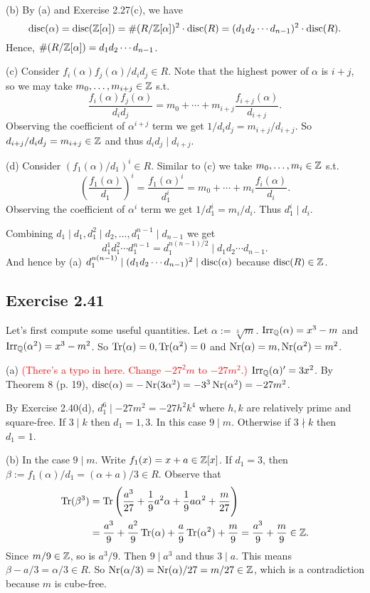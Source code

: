 \documentclass[../Marcus.tex]{subfiles}
\begin{document}
(b) By (a) and Exercise 2.27(c), we have
$$
\operatorname{disc}(\alpha)=\operatorname{disc}(\mathbb{Z}[\alpha])
= \#(R/\mathbb{Z}[\alpha])^2\cdot\operatorname{disc}(R)
= (d_1d_2\cdots d_{n-1})^2\cdot\operatorname{disc}(R).
$$
Hence, $\#(R/\mathbb{Z}[\alpha])=d_1d_2\cdots d_{n-1}$.

(c) Consider $f_i(\alpha)f_j(\alpha)/d_id_j\in R$. Note that the highest power of $\alpha$ is $i+j$, so we may take $m_0,\ldots,m_{i+j}\in\mathbb{Z}$ s.t. 
$$
\frac{f_i(\alpha)f_j(\alpha)}{d_id_j}=m_0+\cdots+m_{i+j}\frac{f_{i+j}(\alpha)}{d_{i+j}}.
$$ 
Observing the coefficient of $\alpha^{i+j}$ term we get $1/d_id_j=m_{i+j}/d_{i+j}$. So $d_{i+j}/d_id_j=m_{i+j}\in\mathbb{Z}$ and thus $d_id_j\mid d_{i+j}$.

(d) Consider $(f_1(\alpha)/d_1)^i\in R$. Similar to (c) we take $m_0,\ldots,m_i\in\mathbb{Z}$ s.t. 
$$
\left(\frac{f_1(\alpha)}{d_1}\right)^i=\frac{f_1(\alpha)^i}{d_1^i}=m_0+\cdots+m_i\frac{f_i(\alpha)}{d_i}.
$$ 
Observing the coefficient of $\alpha^i$ term we get $1/d_1^i=m_i/d_i$. Thus $d_1^i\mid d_i$.

Combining $d_1\mid d_1,d_1^2\mid d_2,\ldots,d_1^{n-1}\mid d_{n-1}$ we get 
$$
d_1^1d_1^2\cdots d_1^{n-1}=d_1^{n(n-1)/2}\mid d_1d_2\cdots d_{n-1}.
$$ 
And hence by (a) $d_1^{n(n-1)}\mid (d_1d_2\cdots d_{n-1})^2\mid \operatorname{disc}(\alpha)$ because $\operatorname{disc}(R)\in\mathbb{Z}$.

\subsection*{Exercise 2.41}

Let's first compute some useful quantities. Let $\alpha:=\sqrt[3]{m}$. $\operatorname{Irr}_{\mathbb{Q}}(\alpha)=x^3-m$ and $\operatorname{Irr}_{\mathbb{Q}}(\alpha^2)=x^3-m^2$. So $\operatorname{Tr}(\alpha)=0,\operatorname{Tr}(\alpha^2)=0$ and $\operatorname{Nr}(\alpha)=m,\operatorname{Nr}(\alpha^2)=m^2$.

(a) \textcolor{red}{(There's a typo in here. Change $-27^2m$ to $-27m^2$.)} $\operatorname{Irr}_{\mathbb{Q}}(\alpha)'=3x^2$. By Theorem 8 (p. 19), $\operatorname{disc}(\alpha)=-\operatorname{Nr}(3\alpha^2)=-3^3\operatorname{Nr}(\alpha^2)=-27m^2$.

By Exercise 2.40(d), $d_1^6\mid -27m^2=-27h^2k^4$ where $h,k$ are relatively prime and square-free. If $3\mid k$ then $d_1=1,3$. In this case $9\mid m$. Otherwise if $3\nmid k$ then $d_1=1$.

(b) In the case $9\mid m$. Write $f_1(x)=x+a\in\mathbb{Z}[x]$. If $d_1=3$, then $\beta:=f_1(\alpha)/d_1=(\alpha+a)/3\in R$. Observe that
\begin{align*}
    \operatorname{Tr}(\beta^3) &= \operatorname{Tr}\left(\frac{a^3}{27}+\frac{1}{9}a^2\alpha+\frac{1}{9}a\alpha^2+\frac{m}{27}\right) \\ 
    &= \frac{a^3}{9}+\frac{a^2}{9}\operatorname{Tr}(\alpha)+\frac{a}{9}\operatorname{Tr}(\alpha^2)+\frac{m}{9} = \frac{a^3}{9}+\frac{m}{9} \in\mathbb{Z}.
\end{align*}
Since $m/9\in\mathbb{Z}$, so is $a^3/9$. Then $9\mid a^3$ and thus $3\mid a$. This means $\beta-a/3=\alpha/3\in R$. So $\operatorname{Nr}(\alpha/3)=\operatorname{Nr}(\alpha)/27=m/27\in\mathbb{Z}$, which is a contradiction because $m$ is cube-free.
\end{document}
